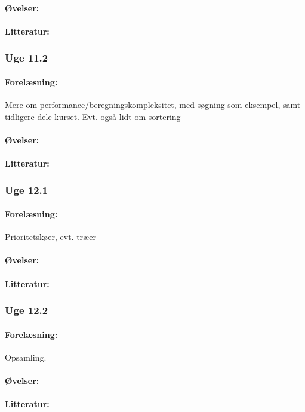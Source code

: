 \documentclass[12pt]{article}
\begin{document}
\paragraph{Øvelser:}
\paragraph{Litteratur:}

\subsubsection{Uge 11.2}
\paragraph{Forelæsning:} 
Mere om performance/beregningskompleksitet, med søgning som eksempel, samt tidligere dele kurset.
Evt. også lidt om sortering
\paragraph{Øvelser:}
\paragraph{Litteratur:}

\subsubsection{Uge 12.1}
\paragraph{Forelæsning:} 
Prioritetskøer, evt. træer
\paragraph{Øvelser:}
\paragraph{Litteratur:}


\subsubsection{Uge 12.2}
\paragraph{Forelæsning:} 
Opsamling. 
\paragraph{Øvelser:}
\paragraph{Litteratur:}
\end{document}
